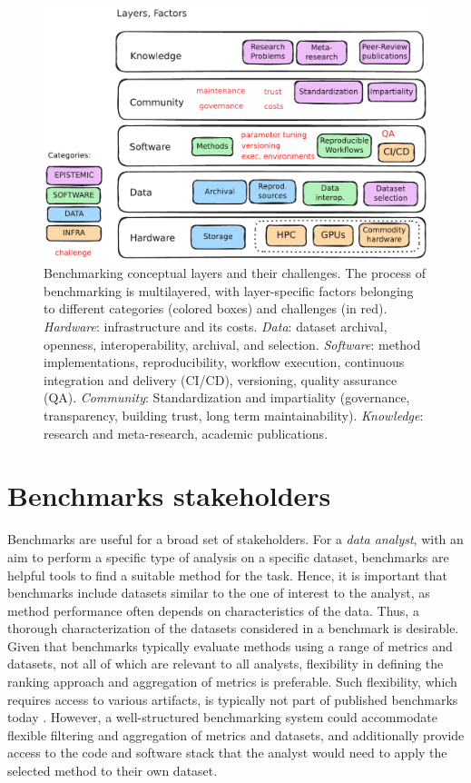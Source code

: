 \documentclass[11pt]{article}
\begin{document}
\begin{figure}
    \centering
    \includegraphics[width=0.8\linewidth]{figures/bens_layers.pdf}
    \caption[Benchmarking conceptual layers and their challenges.]{Benchmarking conceptual layers and their challenges. The process of benchmarking is multilayered, with layer-specific factors belonging to different categories (colored boxes) and challenges (in red). \emph{Hardware}: infrastructure and its costs. \emph{Data}: dataset archival, openness, interoperability, archival, and selection.  \emph{Software}: method implementations, reproducibility, workflow execution, continuous integration and delivery (CI/CD), versioning, quality assurance (QA). \emph{Community}: Standardization and impartiality (governance, transparency, building trust, long term maintainability). \emph{Knowledge}: research and meta-research, academic publications.}
    \label{fig:layers}
\end{figure}

\section*{Benchmarks stakeholders}

Benchmarks are useful for a broad set of stakeholders. For a \emph{data analyst}, with an aim to perform a specific type of analysis on a specific dataset, benchmarks are helpful tools to find a suitable method for the task. Hence, it is important that benchmarks include datasets similar to the one of interest to the analyst, as method performance often depends on characteristics of the data. Thus, a thorough characterization of the datasets considered in a benchmark is desirable. Given that benchmarks typically evaluate methods using a range of metrics and datasets, not all of which are relevant to all analysts, flexibility in defining the ranking approach and aggregation of metrics is preferable. Such flexibility, which requires access to various artifacts, is typically not part of published benchmarks today \cite{Sonrel2023-te}. However, a well-structured benchmarking system could accommodate flexible filtering and aggregation of metrics and datasets, and additionally provide access to the code and software stack that the analyst would need to apply the selected method to their own dataset. 
\end{document}
